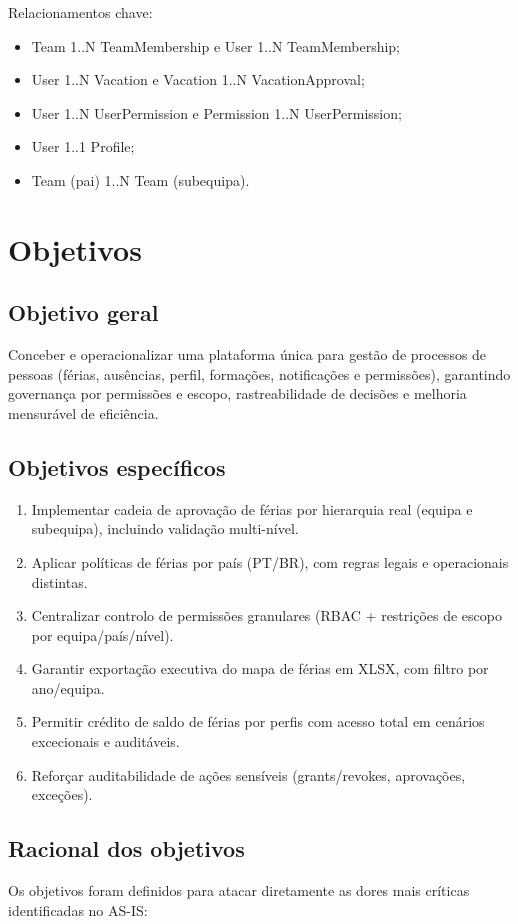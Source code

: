 \documentclass[11pt,a4paper]{article}
\begin{document}
Relacionamentos chave:
\begin{itemize}
  \item Team 1..N TeamMembership e User 1..N TeamMembership;
  \item User 1..N Vacation e Vacation 1..N VacationApproval;
  \item User 1..N UserPermission e Permission 1..N UserPermission;
  \item User 1..1 Profile;
  \item Team (pai) 1..N Team (subequipa).
\end{itemize}

\section{Objetivos}
\subsection{Objetivo geral}
Conceber e operacionalizar uma plataforma única para gestão de processos de pessoas (férias, ausências, perfil, formações, notificações e permissões), garantindo governança por permissões e escopo, rastreabilidade de decisões e melhoria mensurável de eficiência.

\subsection{Objetivos específicos}
\begin{enumerate}
  \item Implementar cadeia de aprovação de férias por hierarquia real (equipa e subequipa), incluindo validação multi-nível.
  \item Aplicar políticas de férias por país (PT/BR), com regras legais e operacionais distintas.
  \item Centralizar controlo de permissões granulares (RBAC + restrições de escopo por equipa/país/nível).
  \item Garantir exportação executiva do mapa de férias em XLSX, com filtro por ano/equipa.
  \item Permitir crédito de saldo de férias por perfis com acesso total em cenários excecionais e auditáveis.
  \item Reforçar auditabilidade de ações sensíveis (grants/revokes, aprovações, exceções).
\end{enumerate}

\subsection{Racional dos objetivos}
Os objetivos foram definidos para atacar diretamente as dores mais críticas identificadas no AS-IS:
\end{document}
